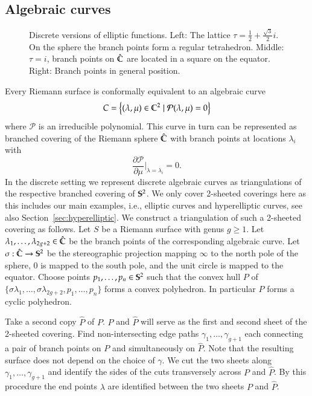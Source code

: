 \documentclass[Thesis.tex]{subfiles}
\begin{document}
\subsection{Algebraic curves}
\label{sec:discrete_algebraic_curves}

\begin{figure}
\centering
{}
\caption{Discrete versions of elliptic functions. Left: The lattice $\tau=\frac{1}{2}+\frac{\sqrt 3}{2}i$. On the sphere the branch points form a regular tetrahedron. Middle: $\tau=i$, branch points on $\hat \C$ are located in a square on the equator. Right: Branch points in general position.}
\label{fig:p_functions}
\end{figure}

Every Riemann surface is conformally equivalent to an algebraic curve
\[C=\left\{(\lambda,\mu)\in \C^2 \mid \mathcal P(\lambda,\mu)=0\right\}\]
where $\mathcal P$ is an irreducible polynomial.
This curve in turn can be represented as branched covering of the Riemann sphere $\hat{\C}$ with branch points at locations $\lambda_i$ with \[\frac{\partial\mathcal P}{\partial \mu}\Bigr|_{\lambda=\lambda_i} = 0.\]
In the discrete setting we represent discrete algebraic curves as triangulations of the respective branched covering of $\S^2$.
We only cover 2-sheeted coverings here as this includes our main examples, i.e., elliptic curves and hyperelliptic curves, see also Section~\ref{sec:hyperelliptic}.
We construct a triangulation of such a 2-sheeted covering as follows.
Let $S$ be a Riemann surface with genus $g\geq 1$.
Let $\lambda_1,\ldots,\lambda_{2g+2}\in \hat\C$ be the branch points of the corresponding algebraic curve.
Let $\sigma :\hat\C\to\S^2$ be the stereographic projection mapping $\infty$ to the north pole of the sphere, $0$ is mapped to the south pole, and the unit circle is mapped to the equator.
Choose points $p_1,\ldots,p_n\in\S^2$ such that the convex hull $P$ of $\{\sigma\lambda_1,\ldots,\sigma\lambda_{2g+2},p_1,\ldots,p_n\}$ forms a convex polyhedron.
In particular $P$ forms a cyclic polyhedron.

Take a second copy $\hat P$ of $P$. $P$ and $\hat P$ will serve as the first and second sheet of the 2-sheeted covering.
Find non-intersecting edge paths $\gamma_1,\ldots,\gamma_{g+1}$ each connecting a pair of branch points on $P$ and simultaneously on $\hat P$.
Note that the resulting surface does not depend on the choice of $\gamma$.
We cut the two sheets along $\gamma_1,\ldots,\gamma_{g+1}$ and identify the sides of the cuts transversely across $P$ and $\hat P$.
By this procedure the end points $\lambda$ are identified between the two sheets $P$ and $\hat P$.
\end{document}
